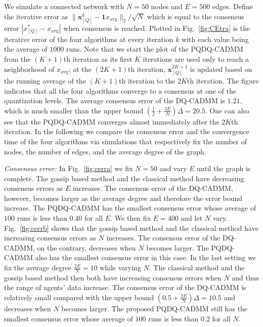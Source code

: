 \documentclass[journal]{IEEEtran}
\begin{document}
We simulate a connected network with $N=50$ nodes and $E=500$ edges. Define the iterative error as ${\|\bm x^k_{[Q]}-\bm 1x_{\text{avg}}\|_2}/{\sqrt{N}}$ which is equal to the consensus error $|x^*_{[Q]}-x_{\text{avg}}|$ when consensus is reached. Plotted in Fig.~\ref{fig:CEtra} is the iterative error of the four algorithms at every iteration $k$ with each value being the average of $1000$ runs. Note that we start the plot of the PQDQ-CADMM from the $(K+1)$th iteration as its first $K$ iterations are used only to reach a neighborhood of $x_{\text{avg}}$; at the $(2K+1)$th iteration, $\bm x^{2K+1}_{[Q]}$ is updated based on the running average of the $(K+1)$th iteration to the $2K$th iteration. The figure indicates that all the four algorithms converge to a consensus at one of the quantization levels. The average consensus error of the DQ-CADMM is $1.21$, which is much smaller than the upper bound $(\frac{1}{2}+\frac{2E}{N})\Delta = 20.5$. One can also see that the PQDQ-CADMM converges almost immediately after the $2K$th iteration. In the following we compare the consensus error and the convergence time of the four algorithms via simulations that respectively fix the number of nodes, the number of edges, and the average degree of the graph.

{\it Consensus error:}
In Fig.~\ref{fig:cerra} we fix $N=50$ and vary $E$ until the graph is complete. The gossip based method and the classical method have decreasing consensus errors as $E$ increases. The consensus error of the DQ-CADMM, however, becomes larger as the average degree and therefore the error bound increase. The PQDQ-CADMM has the smallest consensus error whose average of $100$ runs is less than $0.40$ for all $E$. We then fix $E = 400$ and let $N$ vary. Fig.~\ref{fig:cerrb} shows that the gossip based method and the classical method have increasing consensus errors as $N$ increases. The consensus error of the DQ-CADMM, on the contrary, decreases when $N$ becomes larger. The PQDQ-CADMM also has the smallest consensus error in this case. In the last setting we fix the average degree $\frac{2E}{N}=10$ while varying $N$. The classical method and the gossip based method then both have increasing consensus errors when $N$ and thus the range of agents' data increase. The consensus error of the DQ-CADMM is relatively small compared with the upper bound $(0.5+\frac{2E}{N})\Delta = 10.5$ and decreases when $N$ becomes larger. The proposed PQDQ-CADMM still has the smallest consensus error whose average of $100$ runs is less than $0.2$ for all $N$.  
 
\end{document}
